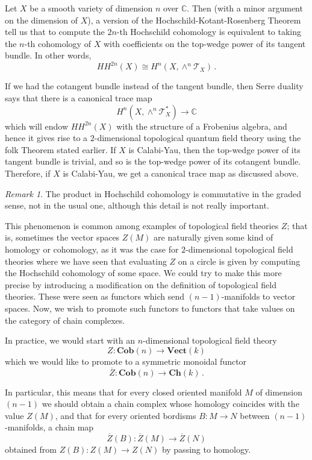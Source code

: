 \documentclass[a4paper,11pt]{article}
\newcommand{\tcal}{\mathcal{T}}
\newcommand{\vecto}{\mathbf{Vect}}
\theoremstyle{plain}
\theoremstyle{definition}
\theoremstyle{remark}
\newtheorem*{rem}{Remark}
\begin{document}
Let $X$ be a smooth variety of dimension $n$ over $\mathbb{C}$. Then (with a minor argument on the dimension of $X$), a version of the Hochschild-Kotant-Rosenberg Theorem tell us that to compute the $2n$-th Hochschild cohomology is equivalent to taking the $n$-th cohomology of $X$ with coefficients on the top-wedge power of its tangent bundle. In other words, 
$$HH^{2n}(X) \cong H^n(X, \wedge^n \tcal_X) \, .$$

If we had the cotangent bundle instead of the tangent bundle, then Serre duality says that there is a canonical trace map 
$$H^n(X, \wedge^n \tcal^*_X) \to \mathbb{C}$$
which will endow $HH^{2n}(X)$ with the structure of a  Frobenius algebra, and hence it gives rise to a $2$-dimensional topological quantum field theory using the folk Theorem stated earlier. If $X$ is Calabi-Yau, then the top-wedge power of its tangent bundle is trivial, and so is the top-wedge power of its cotangent bundle. Therefore, if $X$ is Calabi-Yau, we get a canonical trace map as discussed above.

\begin{rem}
The product in Hochschild cohomology is commutative in the graded sense, not in the usual one, although this detail is not really important. 
\end{rem}



This phenomenon is common among examples of topological field theories $Z$; that is, sometimes the vector spaces $Z(M)$ are naturally given some kind of homology or cohomology, as it was the case for $2$-dimensional topological field theories where we have seen that evaluating $Z$ on a circle is given by computing the Hochschild cohomology of some space. We could try to make this more precise by introducing a modification on the definition of topological field theories. These were seen as functors which send $(n-1)$-manifolds to vector spaces. Now, we wish to promote such functors to functors that take values on the category of chain complexes. 

In practice, we would start with an $n$-dimensional topological field theory 
$$Z \colon \textbf{Cob}(n) \to \vecto(k)$$
which we would like to promote to a symmetric monoidal functor 
$$\overline{Z} \colon \textbf{Cob}(n) \to \textbf{Ch}(k) \, .$$

In particular, this means that for every closed oriented manifold $M$ of dimension $(n-1)$ we should obtain a chain complex whose homology coincides with the value $Z(M)$, and that for every oriented bordisms $B \colon M \to N$ between $(n-1)$-manifolds, a chain map 
$$\overline{Z}(B) \colon \overline{Z}(M) \to \overline{Z}(N)$$
obtained from $Z(B) \colon Z(M) \to Z(N)$ by passing to homology. 
\end{document}
